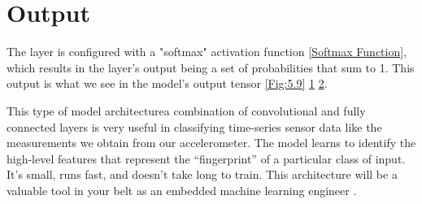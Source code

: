\section{Output}

The layer is configured with a "softmax" activation function \ref{Softmax Function}, which results in the layer’s output being a set of probabilities that sum to 1. This output is what we see in the model’s output tensor \ref{Fig:5.9} \ref{Fig:5.10} \ref{Fig:5.11}.

This type of model architecturea combination of convolutional and fully connected layers is very useful in classifying time-series sensor data like the measurements we obtain from our accelerometer. The model learns to identify the high-level features that represent the “fingerprint” of a particular class of input. It’s small, runs fast, and doesn’t take long to train. This architecture will be a valuable tool in your belt as an embedded machine learning engineer \cite{War:2020}.

\begin{center}
	
	\label{Fig:5.9}
\end{center}

\begin{figure}[H]\centering
	\label{Fig:5.10}
\end{figure}

\begin{figure}[H]\centering
	\label{Fig:5.11}
\end{figure}

